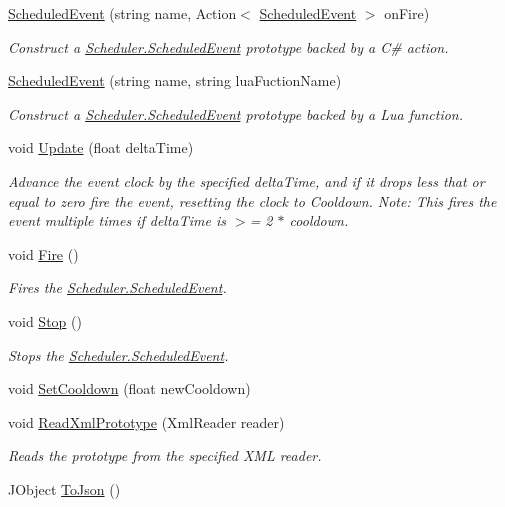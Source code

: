 \begin{DoxyCompactItemize}
\hyperlink{class_scheduler_1_1_scheduled_event_a25d120ed1667f2542f7ffdfec7e79d89}{Scheduled\+Event} (string name, Action$<$ \hyperlink{class_scheduler_1_1_scheduled_event}{Scheduled\+Event} $>$ on\+Fire)
\begin{DoxyCompactList}\small\item\em Construct a \hyperlink{class_scheduler_1_1_scheduled_event}{Scheduler.\+Scheduled\+Event} prototype backed by a C\# action. \end{DoxyCompactList}\item 
\hyperlink{class_scheduler_1_1_scheduled_event_af331abbf2942f9889e7013587bfa5f8a}{Scheduled\+Event} (string name, string lua\+Fuction\+Name)
\begin{DoxyCompactList}\small\item\em Construct a \hyperlink{class_scheduler_1_1_scheduled_event}{Scheduler.\+Scheduled\+Event} prototype backed by a Lua function. \end{DoxyCompactList}\item 
void \hyperlink{class_scheduler_1_1_scheduled_event_a524553957da7bdb1e5bad3eeffd7ae8a}{Update} (float delta\+Time)
\begin{DoxyCompactList}\small\item\em Advance the event clock by the specified delta\+Time, and if it drops less that or equal to zero fire the event, resetting the clock to Cooldown. Note\+: This fires the event multiple times if delta\+Time is $>$= 2 $\ast$ cooldown. \end{DoxyCompactList}\item 
void \hyperlink{class_scheduler_1_1_scheduled_event_a232f2ce8f94c538c9e8be6af7177c8fd}{Fire} ()
\begin{DoxyCompactList}\small\item\em Fires the \hyperlink{class_scheduler_1_1_scheduled_event}{Scheduler.\+Scheduled\+Event}. \end{DoxyCompactList}\item 
void \hyperlink{class_scheduler_1_1_scheduled_event_ac45f7ec5f81d79844b5fcceee0ea09e2}{Stop} ()
\begin{DoxyCompactList}\small\item\em Stops the \hyperlink{class_scheduler_1_1_scheduled_event}{Scheduler.\+Scheduled\+Event}. \end{DoxyCompactList}\item 
void \hyperlink{class_scheduler_1_1_scheduled_event_a2ae6d7d00285809b7af79838b419b81f}{Set\+Cooldown} (float new\+Cooldown)
\item 
void \hyperlink{class_scheduler_1_1_scheduled_event_a2a4b07d98d26c870403ae7d405c0dfc9}{Read\+Xml\+Prototype} (Xml\+Reader reader)
\begin{DoxyCompactList}\small\item\em Reads the prototype from the specified X\+ML reader. \end{DoxyCompactList}\item 
J\+Object \hyperlink{class_scheduler_1_1_scheduled_event_a16217933397481d05dd690b5a67e3fdb}{To\+Json} ()
\end{DoxyCompactItemize}
